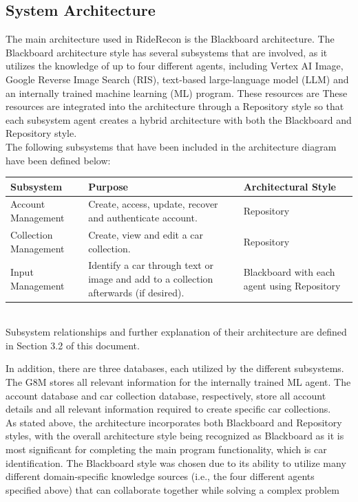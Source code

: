 \documentclass[]{article}
\begin{document}
\subsection{System Architecture}
\label{sub:system_architecture}
The main architecture used in RideRecon is the Blackboard architecture. The Blackboard architecture style has several subsystems that are involved, as it utilizes the knowledge of up to four different agents, including Vertex AI Image, Google Reverse Image Search (RIS), text-based large-language model (LLM) and an internally trained machine learning (ML) program. These resources are These resources are integrated into the architecture through a Repository style so that each subsystem agent creates a hybrid architecture with both the Blackboard and Repository style.\\

\noindent The following subsystems that have been included in the architecture diagram have been defined below:\\

\noindent
\begin{tabular}{|p{4cm}|p{7cm}|p{3.5cm}|}
	\hline
	Subsystem & Purpose & Architectural Style \\
	\hline
	Account Management & Create, access, update, recover and authenticate account. & Repository \\
	\hline
	Collection Management & Create, view and edit a car collection. & Repository \\
	\hline
	Input Management & Identify a car through text or image and add to a collection afterwards (if desired). & Blackboard with each agent using Repository \\
	\hline
\end{tabular}\\


\noindent Subsystem relationships and further explanation of their architecture are defined in Section 3.2 of this document.

\noindent In addition, there are three databases, each utilized by the different subsystems. The G8M stores all relevant information for the internally trained ML agent. The account database and car collection database, respectively, store all account details and all relevant information required to create specific car collections.\\

\noindent As stated above, the architecture incorporates both Blackboard and Repository styles, with the overall architecture style being recognized as Blackboard as it is most significant for completing the main program functionality, which is car identification. The Blackboard style was chosen due to its ability to utilize many different domain-specific knowledge sources (i.e., the four different agents specified above) that can collaborate together while solving a complex problem\\
\end{document}
